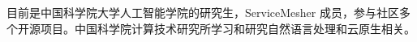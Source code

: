 

\begin{cvparagraph}
\begin{minipage}[t]{\textwidth}
目前是中国科学院大学人工智能学院的研究生，ServiceMesher 成员，参与社区多个开源项目。中国科学院计算技术研究所学习和研究自然语言处理和云原生相关。
\end{minipage}
\end{cvparagraph}
